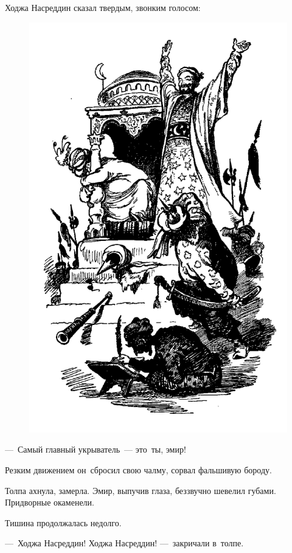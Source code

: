\documentclass[12pt,a4paper]{book}
\begin{document}
Ходжа Насреддин сказал твердым, звонким голосом:

\begin{figure}[p]
\centering
\includegraphics[width=\textwidth]{18.png}
\end{figure}

—~Самый главный укрыватель~— это~ты, эмир!

Резким движением он~сбросил свою чалму, сорвал фальшивую бороду.

Толпа ахнула, замерла. Эмир, выпучив глаза, беззвучно шевелил губами. Придворные окаменели.

Тишина продолжалась недолго.

—~Ходжа Насреддин! Ходжа Насреддин! —~закричали в~толпе.
\end{document}
